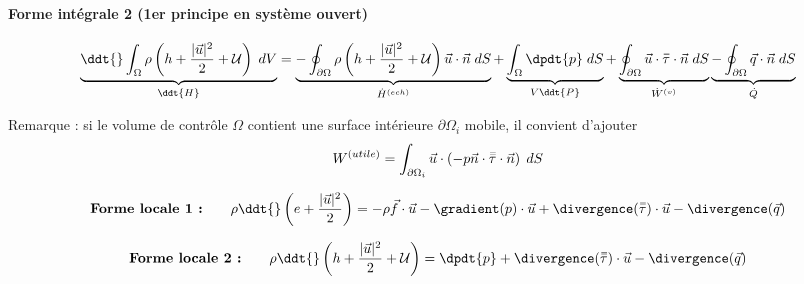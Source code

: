 \paragraph{Forme intégrale 2 (1er principe en système ouvert)}
\begin{equation}
		\underbrace{
		\ddt{} \int_{\Omega} \rho \left( h + \frac{ |\vec{u}|^2}{2} + {\cal U} \right) \; dV
		 }_{\ddt{H} }	
		= \underbrace{-  \oint_{\partial \Omega}  \rho \left( h + \frac{ |\vec{u}|^2}{2} + {\cal U} \right) \vec{u} \cdot \vec{n} \; dS
		}_{\dot{H}^{(ech)}} 
		+ \underbrace{ \int _{\Omega} \dpdt{p}\; dS
		}_{ V \ddt{P}  } 
		+ \underbrace{ \oint_{\partial \Omega} \vec{u} \cdot \mytensor{\tau} \cdot \vec{n}   \; dS 
		}_{\dot{W}^{(v)}} 
		 \underbrace{ - \oint_{\partial \Omega} \vec{q} \cdot \vec{n} \; dS
		}_{\dot{Q}} 
		\label{eq:bilan_global_eulerien_e2}
\end{equation}

Remarque : si le volume de contrôle ${\Omega}$ contient une surface intérieure ${\partial \Omega}_i$ mobile,
il convient d'ajouter
$$
W^{(utile)} = \int_{{\partial \Omega}_i}  \vec{u} \cdot \left( -p \vec{n}  \cdot  \accentset{=}{\tau} \cdot \vec{n} \right)  \; dS
$$ 





\begin{equation}
\mbox{\bf Forme locale 1 :} \qquad 
		\rho \ddt{} \left( e+ \frac{|\vec{u}|^2}{2} \right) 
		= -\rho \vec{f} \cdot \vec{u} 
		- \gradient ( p) \cdot  \vec{u}  
		+ \divergence ( \mytensor{\tau}) \cdot \vec{u}  
		 - \divergence(\vec{q})
\end{equation}



\begin{equation}
\mbox{\bf Forme locale 2 :} \qquad 
		\rho \ddt{} \left( h + \frac{|\vec{u}|^2}{2} + {\cal U} \right) 
		=
		 \dpdt{p}
		+ \divergence ( \mytensor{\tau}) \cdot \vec{u}  
		 - \divergence(\vec{q})
\end{equation}


